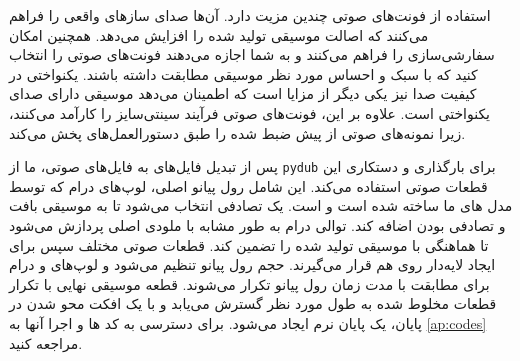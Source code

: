 استفاده از فونت‌های صوتی چندین مزیت دارد. آن‌ها صدای سازهای واقعی را فراهم
می‌کنند که اصالت موسیقی تولید شده را افزایش می‌دهد. همچنین امکان
سفارشی‌سازی را فراهم می‌کنند و به شما اجازه می‌دهند فونت‌های صوتی را انتخاب
کنید که با سبک و احساس مورد نظر موسیقی مطابقت داشته باشند. یکنواختی در
کیفیت صدا نیز یکی دیگر از مزایا است که اطمینان می‌دهد موسیقی دارای صدای
یکنواختی است. علاوه بر این، فونت‌های صوتی فرآیند سینتی‌سایز را کارآمد
می‌کنند، زیرا  نمونه‌های صوتی از پیش ضبط شده را طبق
دستورالعمل‌های  پخش می‌کند.

پس از تبدیل فایل‌های  به فایل‌های صوتی، ما از \texttt{pydub} برای
بارگذاری و دستکاری این قطعات صوتی استفاده می‌کند. این شامل رول پیانو
اصلی، لوپ‌های درام که توسط مدل های ما ساخته شده است و   است. یک  تصادفی انتخاب می‌شود
تا به موسیقی بافت و تصادفی بودن اضافه کند. توالی درام به طور مشابه با
ملودی اصلی پردازش می‌شود تا هماهنگی با موسیقی تولید شده را تضمین کند.
قطعات صوتی مختلف سپس برای ایجاد لایه‌دار روی هم قرار
می‌گیرند. حجم رول پیانو تنظیم می‌شود و لوپ‌های  و درام برای مطابقت با
مدت زمان رول پیانو تکرار می‌شوند. قطعه موسیقی نهایی با تکرار قطعات مخلوط
شده به طول مورد نظر گسترش می‌یابد و با یک افکت محو شدن در پایان، یک پایان
نرم ایجاد می‌شود. برای دسترسی به کد ها و اجرا آنها به \ref{ap:codes} مراجعه کنید.
